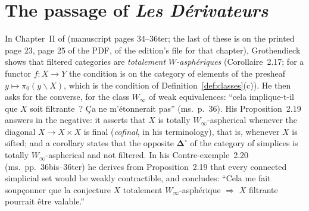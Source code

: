 \section{The passage of \emph{Les D\'erivateurs}}\label{sec:manuscript}

In Chapter~II of \cite{Der} (manuscript pages 34--36ter; the last of these is
on the printed page 23, page 25 of the PDF, of the edition's file for that
chapter), Grothendieck shows that filtered categories are \emph{totalement
$W$-asph\'eriques} (Corollaire~2.17; for a functor $f\colon X\to Y$ the
condition is on the category of elements of the presheaf
$y\mapsto\pi_0(y\backslash X)$, which is the condition of
Definition~\ref{def:classes}(c)). He then asks for the converse, for the
class $W_\infty$ of weak equivalences: ``cela implique-t-il que $X$ soit
filtrante~? \c{C}a ne m'\'etonnerait pas'' (ms.~p.~36). His Proposition~2.19
answers in the negative: it asserts that $X$ is totally $W_\infty$-aspherical
whenever the diagonal $X\to X\times X$ is final (\emph{cofinal}, in his
terminology), that is, whenever $X$ is sifted; and a corollary states that
the opposite $\boldsymbol\Delta^{\circ}$ of the category of simplices is
totally $W_\infty$-aspherical and not filtered. In his Contre-exemple~2.20
(ms.~pp.~36bis--36ter) he derives from Proposition~2.19 that every connected
simplicial set would be weakly contractible, and concludes: ``Cela me fait
soup\c{c}onner que la conjecture
$X$ totalement $W_\infty$-asph\'erique $\Longrightarrow$ $X$ filtrante
pourrait \^etre valable.''

